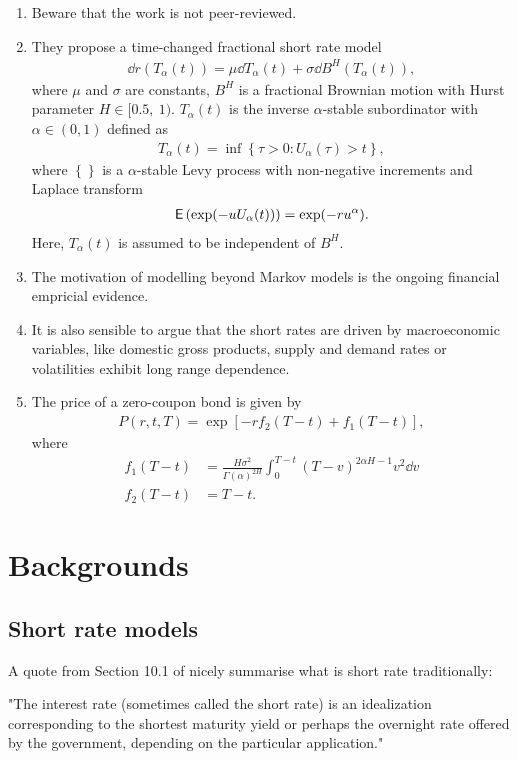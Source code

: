 \documentclass[square]{article} %
\theoremstyle{plain}
\theoremstyle{definition} %
\begin{document}
\cite{shokrollahi2021time}
\begin{enumerate}
  \item Beware that the work is not peer-reviewed. 
  \item They propose a time-changed fractional short rate model 
  \begin{align*}
    \dd r(T_\alpha(t)) = \mu \dd T_\alpha(t) + \sigma \dd B^H(T_\alpha (t)),
  \end{align*}
  where $\mu$ and $\sigma$ are constants, $B^H$ is a fractional Brownian motion with Hurst parameter $H\in[0.5,\ 1)$. 
  $T_\alpha(t)$ is the inverse 
  $\alpha$-stable subordinator with $\alpha \in(0,1)$ defined as 
  \begin{align*}
    T_\alpha(t) = \inf\left\{\tau > 0 : U_\alpha(\tau)>t\right\},
  \end{align*}
  where $\left\{\right\}$ is a $\alpha$-stable Levy process with non-negative increments and Laplace transform
  \begin{align*}
    \mathbb{\sf E}\left(\exp(-u U_\alpha(t))\right)= \exp(-ru^\alpha).
  \end{align*}
  Here, $T_\alpha(t)$ is assumed to be independent of $B^H$. 
  \item The motivation of modelling beyond Markov models is the ongoing financial empricial evidence. 
  \item It is also sensible to argue that the short rates are driven by macroeconomic variables, like 
  domestic gross products, supply and demand rates or volatilities exhibit long range dependence. 
  \item The price of a zero-coupon bond is given by 
  \begin{align*}
    P(r,t,T) = \exp\left[-r f_2(T-t) + f_1(T-t)\right],
  \end{align*}
  where 
  \begin{align*}
f_1(T-t) &= \frac{H \sigma^2}{\Gamma(\alpha)^{2H}}\int^{T-t}_0 (T-v)^{2\alpha H -1}v^2 \dd v\\
f_2(T-t) & = T-t. 
\end{align*}
\end{enumerate}

\section{Backgrounds}
\subsection{Short rate models}
A quote from Section 10.1 of \cite{Shreve2004a} nicely summarise what is short rate traditionally:
\begin{displayquote}
  "The interest rate (sometimes called the short rate) is an {\color{red} idealization} corresponding to the shortest maturity yield or perhaps the overnight rate offered by the government, depending on the particular application."
\end{displayquote}
\end{document}
